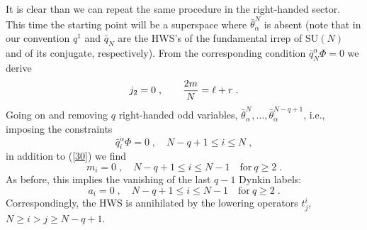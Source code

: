 \documentclass[a4paper,12pt]{article}
\begin{document}
It is clear than we can repeat the same procedure in the 
right-handed sector. This time the starting point will be a 
superspace where $\bar\theta^N_{\dot\alpha}$ is absent (note that 
in our convention $q^1$ and $\bar q_N$ are the HWS's of the 
fundamental irrep of $\mbox{SU}(N)$ and of its conjugate, 
respectively). From the corresponding condition $\bar 
q_N^{\dot\alpha}\Phi=0$ we derive 
\begin{equation}\label{30}
  j_2=0\;, \qquad {2m\over N}=\ell+r\;.
\end{equation}
Going on and removing $q$ right-handed odd variables, 
$\bar\theta^N_{\dot\alpha},\ldots,\bar\theta^{N-q+1}_{\dot\alpha}$, 
i.e., imposing the constraints 
\begin{equation}\label{30'}
  \bar 
q_i^{\dot\alpha}\Phi=0\;, \quad  N-q+1\leq i \leq N \;,
\end{equation}
in addition to (\ref{30}) we find 
\begin{equation}\label{31}
  m_i=0\;, \quad  N-q+1\leq i \leq N-1   \quad \mbox{for}\ q\geq2\;.
\end{equation}
As before, this implies the vanishing of the last $q-1$ Dynkin 
labels:
\begin{equation}\label{32}
  a_i=0\;, \quad  N-q+1\leq i \leq N-1  \quad \mbox{for}\ q\geq2\;.
\end{equation}
Correspondingly, the HWS is annihilated by the lowering operators 
$t^i_j$, $N\geq i > j \geq N-q+1$. 
\end{document}
